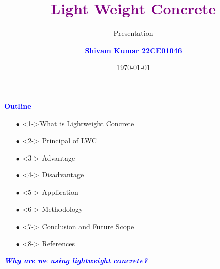 \documentclass[aspectratio=169]{beamer}
\title{\textbf{\textcolor{purple}{Light Weight Concrete}}}
\subtitle{Presentation}
\author{\footnotesize \textbf{\textcolor{blue}{Shivam Kumar}}  \newline \textbf{\textcolor{blue}{22CE01046\vspace{4mm}}}}
\institute{\footnotesize {School of Infrastructure }\\ \vspace{1mm}\textbf{ Indian Institute of Technology Bhubaneswar}}
\date{\today}
\begin{document}

\titlepage

 \begin{frame}{\textcolor{blue}{\textbf{Outline}}}

 \begin{itemize}
     \item [$\bullet$]<1->What is Lightweight Concrete
     \item[$\bullet$]<2-> Principal of LWC
     \item[$\bullet$]<3-> Advantage
     \item[$\bullet$]<4-> Disadvantage 
     \item[$\bullet$]<5-> Application
     \item[$\bullet$]<6-> Methodology
     \item[$\bullet$]<7-> Conclusion and Future Scope
     \item[$\bullet$]<8-> References
 \end{itemize}
\end{frame}
  \begin{frame}{}
 \centering
  \textbf {\textit{\huge\textcolor{blue}{Why are we using lightweight
concrete?}}}
\end{frame}
\end{document}

